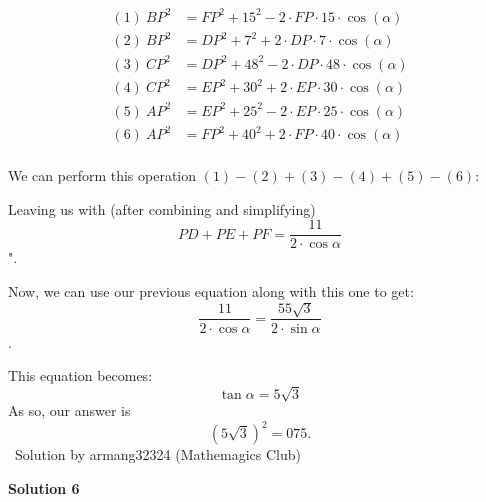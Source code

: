 \begin{enumerate}
{{ 
 \begin{align*} (1) \ BP^2 &= FP^2+15^2-2\cdot FP\cdot15\cdot\cos(\alpha)\\ (2) \ BP^2 &= DP^2+7^2+2\cdot DP\cdot7\cdot\cos(\alpha)\\ (3) \ CP^2 &= DP^2+48^2-2\cdot DP\cdot48\cdot\cos(\alpha)\\ (4) \ CP^2 &= EP^2+30^2+2\cdot EP\cdot30\cdot\cos(\alpha)\\ (5) \ AP^2 &= EP^2+25^2-2\cdot EP\cdot25\cdot\cos(\alpha)\\ (6) \ AP^2 &= FP^2+40^2+2\cdot FP\cdot40\cdot\cos(\alpha)\\ \end{align*}


 We can perform this operation $(1) - (2) + (3) - (4) + (5) - (6)$:

 Leaving us with (after combining and simplifying)
 \[PD + PE + PF=\frac{11}{2\cdot\cos{\alpha}}\]".

 Now, we can use our previous equation along with this one to get:
 \[\frac{11}{2\cdot\cos{\alpha}} = \dfrac{55 \sqrt{3}}{2\cdot\sin{\alpha}}\].

 This equation becomes:
 \[\tan{\alpha} = 5\sqrt{3}\]As so, our answer is
 \[\left(5\sqrt3\right)^2=\boxed{075}.\]~Solution by armang32324 (Mathemagics Club)

 



\textbf{Solution 6}

}}
\end{enumerate}
